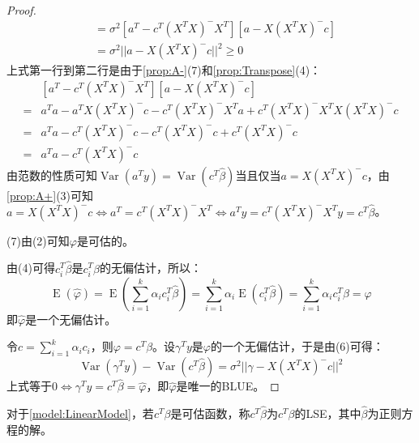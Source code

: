 \begin{proof}
\begin{align*}
		&=\sigma^2[a^T-c^T(X^TX)^-X^T][a-X(X^TX)^-c] \\
		&=\sigma^2||a-X(X^TX)^-c||^2\geqslant0
	\end{align*}
	上式第一行到第二行是由于\cref{prop:A-}(7)和\cref{prop:Transpose}(4)：
	\begin{align*}
		&[a^T-c^T(X^TX)^-X^T][a-X(X^TX)^-c] \\
		=&a^Ta-a^TX(X^TX)^-c-c^T(X^TX)^-X^Ta+c^T(X^TX)^-X^TX(X^TX)^-c \\
		=&a^Ta-c^T(X^TX)^-c-c^T(X^TX)^-c+c^T(X^TX)^-c \\
		=&a^Ta-c^T(X^TX)^-c
	\end{align*}
	由范数的性质可知$\operatorname{Var}(a^Ty)=\operatorname{Var}(c^T\hat{\beta})$当且仅当$a=X(X^TX)^-c$，由\cref{prop:A+}(3)可知$a=X(X^TX)^-c\Leftrightarrow a^T=c^T(X^TX)^-X^T\Leftrightarrow a^Ty=c^T(X^TX)^-X^Ty=c^T\hat{\beta}$。\par
	(7)由(2)可知$\varphi$是可估的。\par
	由(4)可得$c_i^T\hat{\beta}$是$c_i^T\beta$的无偏估计，所以：
	\begin{equation*}
		\operatorname{E}(\hat{\varphi})=\operatorname{E}\left(\sum_{i=1}^{k}\alpha_ic_i^T\hat{\beta}\right)=\sum_{i=1}^{k}\alpha_i\operatorname{E}(c_i^T\hat{\beta})=\sum_{i=1}^{k}\alpha_ic_i^T\beta=\varphi
	\end{equation*}
	即$\hat{\varphi}$是一个无偏估计。\par
	令$c=\sum\limits_{i=1}^{k}\alpha_ic_i$，则$\varphi=c^T\beta$。设$\gamma^Ty$是$\varphi$的一个无偏估计，于是由(6)可得：
	\begin{equation*}
		\operatorname{Var}(\gamma^Ty)-\operatorname{Var}(c^T\hat{\beta})=\sigma^2||\gamma-X(X^TX)^-c||^2
	\end{equation*}
	上式等于$0\Leftrightarrow \gamma^Ty=c^T\hat{\beta}=\hat{\varphi}$，即$\hat{\varphi}$是唯一的BLUE。
\end{proof}
\begin{definition}
	对于\cref{model:LinearModel}，若$c^T\beta$是可估函数，称$c^T\hat{\beta}$为$c^T\beta$的LSE，其中$\hat{\beta}$为正则方程的解。
\end{definition}

